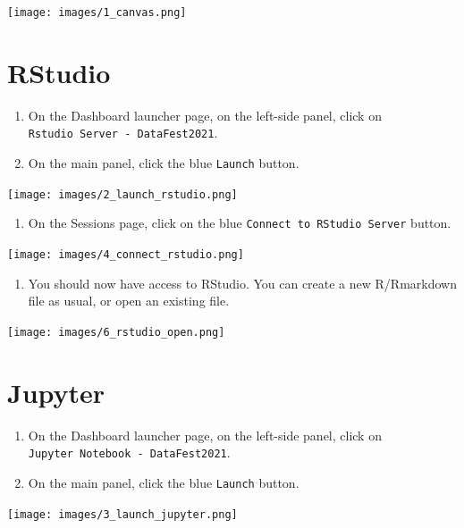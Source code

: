 \documentclass[]{book}
\providecommand{\tightlist}{%
  \setlength{\itemsep}{0pt}\setlength{\parskip}{0pt}}
\begin{document}
\texttt{[image: images/1\_canvas.png]}

\hypertarget{rstudio}{%
\section{RStudio}\label{rstudio}}

\begin{enumerate}
\def\labelenumi{\arabic{enumi}.}
\setcounter{enumi}{1}
\tightlist
\item
  On the Dashboard launcher page, on the left-side panel, click on \texttt{Rstudio\ Server\ -\ DataFest2021}.
\item
  On the main panel, click the blue \texttt{Launch} button.
\end{enumerate}

\texttt{[image: images/2\_launch\_rstudio.png]}

\begin{enumerate}
\def\labelenumi{\arabic{enumi}.}
\setcounter{enumi}{3}
\tightlist
\item
  On the Sessions page, click on the blue \texttt{Connect\ to\ RStudio\ Server} button.
\end{enumerate}

\texttt{[image: images/4\_connect\_rstudio.png]}

\begin{enumerate}
\def\labelenumi{\arabic{enumi}.}
\setcounter{enumi}{4}
\tightlist
\item
  You should now have access to RStudio. You can create a new R/Rmarkdown file as usual, or open an existing file.
\end{enumerate}

\texttt{[image: images/6\_rstudio\_open.png]}

\hypertarget{jupyter}{%
\section{Jupyter}\label{jupyter}}

\begin{enumerate}
\def\labelenumi{\arabic{enumi}.}
\setcounter{enumi}{1}
\tightlist
\item
  On the Dashboard launcher page, on the left-side panel, click on \texttt{Jupyter\ Notebook\ -\ DataFest2021}.
\item
  On the main panel, click the blue \texttt{Launch} button.
\end{enumerate}

\texttt{[image: images/3\_launch\_jupyter.png]}
\end{document}
